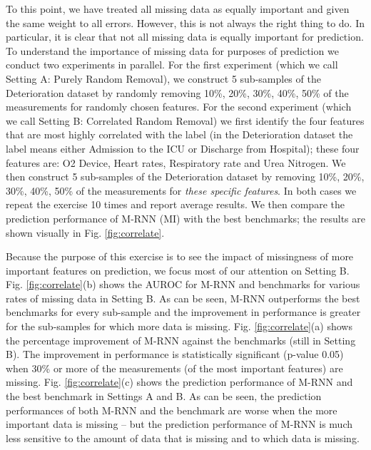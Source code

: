 \documentclass{article}
\begin{document}
To this point, we have treated all missing data as equally important and given the same weight to all errors.  However, this is not always the right thing to do.  In particular, it is clear that not all missing data is equally important for prediction.    To understand the importance of missing data for purposes of prediction we conduct two experiments in parallel.  For the first experiment (which we call Setting A: Purely Random Removal), we construct 5 sub-samples of the Deterioration dataset by randomly removing 10\%, 20\%, 30\%, 40\%, 50\% of the measurements for randomly chosen features. For the second experiment (which we call Setting B: Correlated Random Removal)  we first identify the four features that are most highly correlated with the label (in the Deterioration dataset the label means either Admission to the ICU or Discharge from Hospital); these four features are: O2 Device, Heart rates, Respiratory rate and Urea Nitrogen.  We then construct 5 sub-samples of the Deterioration dataset by removing 10\%, 20\%, 30\%, 40\%, 50\% of the measurements for {\em these  specific features}.  In both cases we repeat the exercise 10 times and report average results.   We then compare the prediction performance of M-RNN (MI) with the best benchmarks; the results are shown visually in Fig. \ref{fig:correlate}.

Because the purpose of this exercise is to see the impact of missingness of more important features on prediction, we focus most of our attention on Setting B. Fig. \ref{fig:correlate}(b) shows the AUROC for M-RNN and benchmarks for various rates of missing data in Setting B.  As can be seen, M-RNN outperforms the best benchmarks for every sub-sample and the improvement in performance is greater for the sub-samples for which more data is missing.  Fig. \ref{fig:correlate}(a) shows the percentage improvement of M-RNN against the benchmarks (still in Setting B).  The improvement in performance is statistically significant (p-value  0.05) when 30\% or more of the measurements (of the most important features) are missing.  Fig. \ref{fig:correlate}(c) shows the prediction performance of M-RNN and the best benchmark in Settings A and B.  As can be seen, the prediction performances of both M-RNN and the benchmark are worse when the more important data is missing -- but the prediction performance of M-RNN is much less sensitive to the amount of data that is missing and to which data is missing.  
\end{document}
